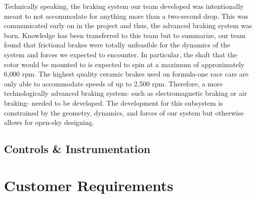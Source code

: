 Technically speaking, the braking system our team developed was intentionally meant to not accommodate for anything more than a two-second drop. This was communicated early on in the project and thus, the advanced braking system was born. Knowledge has been transferred to this team but to summarize, our team found that frictional brakes were totally unfeasible for the dynamics of the system and forces we expected to encounter. In particular, the shaft that the rotor would be mounted to is expected to spin at a maximum of approximately 6,000 rpm. The highest quality ceramic brakes used on formula-one race cars are only able to accommodate speeds of up to 2,500 rpm. Therefore, a more technologically advanced braking system- such as electromagnetic braking or air braking- needed to be developed. The development for this subsystem is constrained by the geometry, dynamics, and forces of our system but otherwise allows for open-sky designing. 


\subsection{Controls \& Instrumentation}










\appendix

\section{Customer Requirements}

